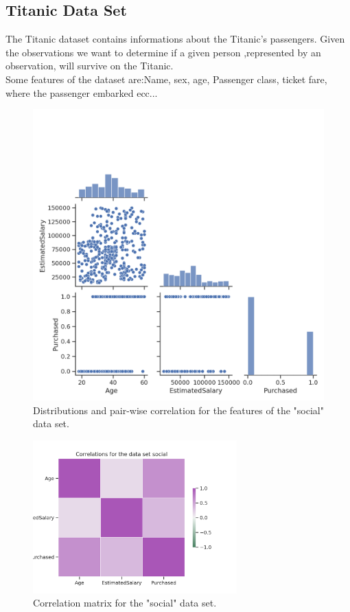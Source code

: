 \documentclass{article}
\begin{document}
\subsection{Titanic Data Set} 
The Titanic dataset contains informations about the Titanic's passengers. Given the observations we want to determine if a given person ,represented by an observation, will survive on the Titanic.\\
Some features of the dataset are:Name, sex, age, Passenger class, ticket fare, where the passenger embarked ecc...

\begin{figure}[h!]
	\centering
	\includegraphics[width=\textwidth]{../plots/social_pairplot.png}
	\caption{ Distributions and pair-wise correlation for the features of the "social" data set.}
	\label{pairplot_income}
\end{figure}


\begin{figure}[h!]
	\centering
	\includegraphics[width=0.7\textwidth]{../plots/social_correlations.png}
	\caption{Correlation matrix for the "social" data set. }
	\label{correlation_income}
\end{figure}
\end{document}

